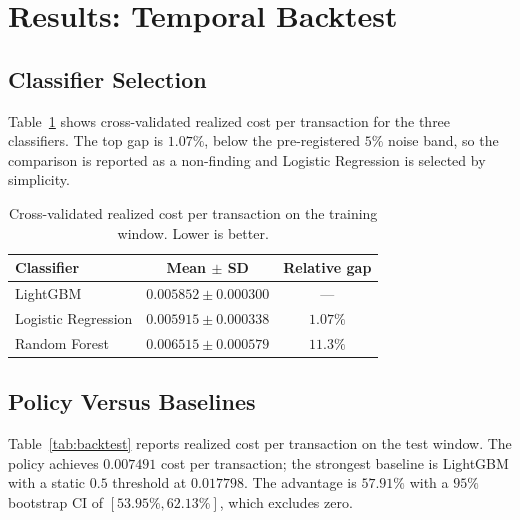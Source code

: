 \documentclass[conference]{IEEEtran}
\begin{document}
\section{Results: Temporal Backtest}
\label{sec:results}

\subsection{Classifier Selection}

Table~\ref{tab:cv} shows cross-validated realized cost per transaction for
the three classifiers. The top gap is $1.07\%$, below the pre-registered
$5\%$ noise band, so the comparison is reported as a non-finding and
Logistic Regression is selected by simplicity.

\begin{table}[!t]
\caption{Cross-validated realized cost per transaction on the training
window. Lower is better.}
\label{tab:cv}
\centering
\small
\begin{tabular}{lcc}
\toprule
Classifier & Mean $\pm$ SD & Relative gap \\
\midrule
LightGBM            & $0.005852 \pm 0.000300$ & --- \\
Logistic Regression & $0.005915 \pm 0.000338$ & $1.07\%$ \\
Random Forest       & $0.006515 \pm 0.000579$ & $11.3\%$ \\
\bottomrule
\end{tabular}
\end{table}

\subsection{Policy Versus Baselines}

Table~\ref{tab:backtest} reports realized cost per transaction on the test
window. The policy achieves $0.007491$ cost per transaction; the strongest
baseline is LightGBM with a static $0.5$ threshold at $0.017798$. The
advantage is $57.91\%$ with a $95\%$ bootstrap CI of $[53.95\%, 62.13\%]$,
which excludes zero.
\end{document}
